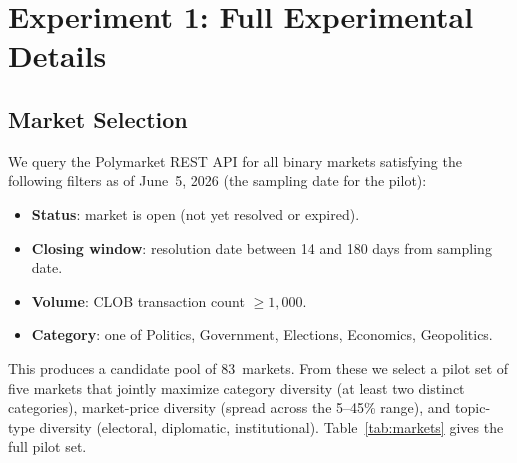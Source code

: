 
\section{Experiment 1: Full Experimental Details}
\label{app:exp1}

\subsection{Market Selection}
\label{app:market-selection}

We query the Polymarket REST API for all binary markets satisfying the following filters as of
June~5, 2026 (the sampling date for the pilot):

\begin{itemize}
  \item \textbf{Status}: market is open (not yet resolved or expired).
  \item \textbf{Closing window}: resolution date between 14 and 180 days from sampling date.
  \item \textbf{Volume}: CLOB transaction count $\geq 1{,}000$.
  \item \textbf{Category}: one of Politics, Government, Elections, Economics, Geopolitics.
\end{itemize}

This produces a candidate pool of 83~markets.  From these we select a pilot set of five markets
that jointly maximize category diversity (at least two distinct categories), market-price diversity
(spread across the 5--45\% range), and topic-type diversity (electoral, diplomatic, institutional).
Table~\ref{tab:markets} gives the full pilot set.

